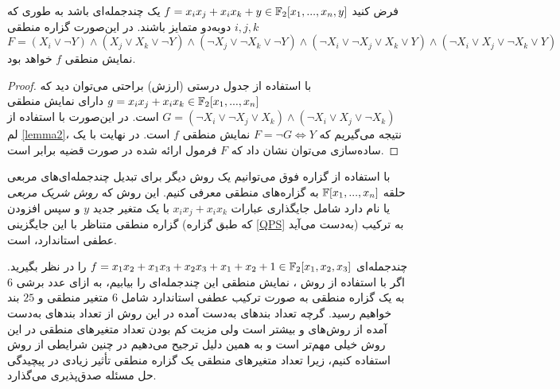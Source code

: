 \begin{proposition}
	\label{QPS}
فرض کنید 
$f = x_{i}x_{j} + x_{i}x_{k} + y\in\mathbb{F}_{2}[x_{1},...,x_{n},y]$
یک چندجمله‌ای باشد به طوری که 
$i,j,k$
دوبه‌دو متمایز باشند. در این‌صورت گزاره منطقی 
{\small $$F = (X_{i}\vee \neg Y)\wedge (X_{j}\vee X_{k}\vee \neg Y)\wedge (\neg X_{j}\vee \neg X_{k}\vee \neg Y)\wedge (\neg X_{i}\vee \neg X_{j}\vee X_{k}\vee Y)\wedge (\neg X_{i}\vee X_{j}\vee \neg X_{k}\vee Y)$$}
نمایش منطقی 
$f$
خواهد بود.
\end{proposition}
\begin{proof}
با استفاده از جدول درستی (ارزش) براحتی می‌توان دید که 
$g = x_{i}x_{j} + x_{i}x_{k}\in\mathbb{F}_{2}[x_{1},...,x_{n}]$
دارای نمایش منطقی 
$G = (\neg X_{i}\vee \neg X_{j}\vee X_{k})\wedge (\neg X_{i}\vee X_{j}\vee \neg X_{k})$
است. در این‌صورت با استفاده از لم 
\ref{lemma2}، 
نتیجه می‌گیریم که 
$F = \neg G\iff Y$
نمایش منطقی 
$f$
است. در نهایت با یک ساده‌سازی می‌توان نشان داد که 
$F$
فرمول ارائه شده در صورت قضیه برابر است. 
\end{proof}
با استفاده از گزاره‌ فوق می‌توانیم یک روش دیگر برای تبدیل چندجمله‌ای‌های مربعی حلقه 
$\mathbb{F}[x_{1},...,x_{n}]$
به گزاره‌های منطقی معرفی کنیم. این روش که 
\textit{روش  شریک مربعی}
یا 
نام دارد شامل  جایگذاری عبارات 
$x_{i}x_{j} + x_{i}x_{k}$
با یک متغیر جدید 
$y$
و سپس افزودن گزاره منطقی متناظر با این جایگزینی (که طبق گزاره 
\ref{QPS}
به‌دست می‌آید) به ترکیب عطفی استاندارد، است. 


\begin{example}
چندجمله‌ای 
$f = x_{1}x_{2} + x_{1}x_{3} + x_{2}x_{3} + x_{1} + x_{2} + 1\in\mathbb{F}_{2}[x_{1},x_{2},x_{3}]$
را در نظر بگیرید. اگر با استفاده از روش 
، 
نمایش منطقی این چندجمله‌ای را بیابیم، به ازای عدد برشی  
$6$
 به یک گزاره منطقی به صورت ترکیب عطفی استاندارد شامل 
 $6$
 متغیر منطقی و 
 $25$
  بند خواهیم رسید. گرچه تعداد بندهای  به‌دست آمده در این روش از تعداد بندهای به‌دست آمده از روش‌های 
و
بیشتر است ولی مزیت کم بودن تعداد متغیرهای منطقی در این روش خیلی مهم‌تر است و به همین دلیل ترجیح می‌دهیم در چنین شرایطی از روش 
استفاده کنیم، زیرا تعداد متغیرهای منطقی یک گزاره منطقی تأثیر زیادی در پیچیدگی حل مسئله صدق‌پذیری می‌گذارد. 
\end{example}

